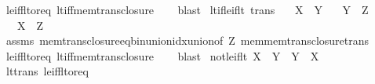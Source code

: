 \begin{isabellebody}
\ le{\isacharunderscore}{\kern0pt}iff{\isacharunderscore}{\kern0pt}lt{\isacharunderscore}{\kern0pt}or{\isacharunderscore}{\kern0pt}eq\ lt{\isacharunderscore}{\kern0pt}iff{\isacharunderscore}{\kern0pt}mem{\isacharunderscore}{\kern0pt}trans{\isacharunderscore}{\kern0pt}closure\isanewline
\ \ \isamarkupfalse%
\ blast%
\endisatagproof
{\isafoldproof}%
%
\isadelimproof
\isanewline
%
\endisadelimproof
\isanewline
{}\isamarkupfalse%
\ lt{\isacharunderscore}{\kern0pt}if{\isacharunderscore}{\kern0pt}le{\isacharunderscore}{\kern0pt}if{\isacharunderscore}{\kern0pt}lt\ {\isacharbrackleft}{\kern0pt}trans{\isacharbrackright}{\kern0pt}{\isacharcolon}{\kern0pt}\isanewline
\ \ \ {\isachardoublequoteopen}X\ {\isacharless}{\kern0pt}\ Y{\isachardoublequoteclose}\isanewline
\ \ \ {\isachardoublequoteopen}Y\ {\isasymle}\ Z{\isachardoublequoteclose}\isanewline
\ \ \ {\isachardoublequoteopen}X\ {\isacharless}{\kern0pt}\ Z{\isachardoublequoteclose}\isanewline
%
\isadelimproof
\ \ %
\endisadelimproof
%
\isatagproof
{}\isamarkupfalse%
\ assms\ mem{\isacharunderscore}{\kern0pt}trans{\isacharunderscore}{\kern0pt}closure{\isacharunderscore}{\kern0pt}eq{\isacharunderscore}{\kern0pt}bin{\isacharunderscore}{\kern0pt}union{\isacharunderscore}{\kern0pt}idx{\isacharunderscore}{\kern0pt}union{\isacharbrackleft}{\kern0pt}of\ Z{\isacharbrackright}{\kern0pt}\ mem{\isacharunderscore}{\kern0pt}mem{\isacharunderscore}{\kern0pt}trans{\isacharunderscore}{\kern0pt}closure{\isacharunderscore}{\kern0pt}trans\isanewline
\ \ \isamarkupfalse%
\ le{\isacharunderscore}{\kern0pt}iff{\isacharunderscore}{\kern0pt}lt{\isacharunderscore}{\kern0pt}or{\isacharunderscore}{\kern0pt}eq\ lt{\isacharunderscore}{\kern0pt}iff{\isacharunderscore}{\kern0pt}mem{\isacharunderscore}{\kern0pt}trans{\isacharunderscore}{\kern0pt}closure\isanewline
\ \ \isamarkupfalse%
\ blast%
\endisatagproof
{\isafoldproof}%
%
\isadelimproof
\isanewline
%
\endisadelimproof
\isanewline
{}\isamarkupfalse%
\ not{\isacharunderscore}{\kern0pt}le{\isacharunderscore}{\kern0pt}if{\isacharunderscore}{\kern0pt}lt{\isacharcolon}{\kern0pt}\ {\isachardoublequoteopen}X\ {\isacharless}{\kern0pt}\ Y\ {\isasymLongrightarrow}\ {\isasymnot}{\isacharparenleft}{\kern0pt}Y\ {\isasymle}\ X{\isacharparenright}{\kern0pt}{\isachardoublequoteclose}\isanewline
%
\isadelimproof
\ \ %
\endisadelimproof
%
\isatagproof
{}\isamarkupfalse%
\ lt{\isacharunderscore}{\kern0pt}trans\ le{\isacharunderscore}{\kern0pt}iff{\isacharunderscore}{\kern0pt}lt{\isacharunderscore}{\kern0pt}or{\isacharunderscore}{\kern0pt}eq\ \isamarkupfalse%

\end{isabellebody}
